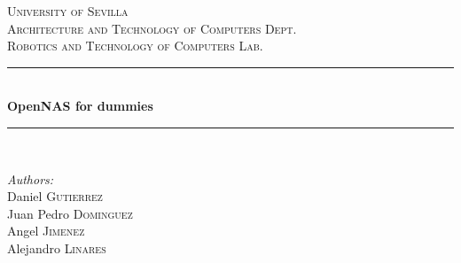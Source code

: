 \begin{titlepage}

\newcommand{\HRule}{\rule{\linewidth}{0.5mm}} %

\center %
 

\textsc{\LARGE University of Sevilla}\\[1.5cm] %
\textsc{\Large Architecture and Technology of Computers Dept.}\\[0.5cm] %
\textsc{\large Robotics and Technology of Computers Lab.}\\[0.5cm] %


\HRule \\[0.4cm]
{ \huge \bfseries OpenNAS for dummies}\\[0.4cm] %
\HRule \\[1.5cm]
 

\begin{minipage}{0.4\textwidth}

\begin{flushleft} \large
\emph{Authors:}\\
Daniel \textsc{Gutierrez} \\ %
Juan Pedro \textsc{Dominguez} \\
Angel \textsc{Jimenez} \\
Alejandro \textsc{Linares}
\end{flushleft}
\end{minipage}
~


\end{titlepage}
